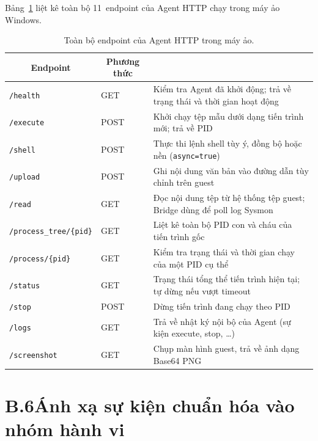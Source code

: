 \documentclass[../DoAn.tex]{subfiles}
\begin{document}
Bảng~\ref{tab:agent-endpoints} liệt kê toàn bộ 11~endpoint của
Agent HTTP chạy trong máy ảo Windows.
\begin{table}[H]
\centering
\caption{Toàn bộ endpoint của Agent HTTP trong máy ảo.}
\label{tab:agent-endpoints}
\begin{tabular}{|l|l|>{\raggedright\arraybackslash}p{6.5cm}|}
\hline
\multicolumn{1}{|c|}{\textbf{Endpoint}} & \multicolumn{1}{c|}{\textbf{Phương thức}} & \multicolumn{1}{c|}{\textbf{Chức năng}} \\
\hline
\texttt{/health}                 & GET  & Kiểm tra Agent đã khởi động; trả về trạng thái và thời gian hoạt động \\
\hline
\texttt{/execute}                & POST & Khởi chạy tệp mẫu dưới dạng tiến trình mới; trả về PID \\
\hline
\texttt{/shell}                  & POST & Thực thi lệnh shell tùy ý, đồng bộ hoặc nền (\texttt{async=true}) \\
\hline
\texttt{/upload}                 & POST & Ghi nội dung văn bản vào đường dẫn tùy chỉnh trên guest \\
\hline
\texttt{/read}                   & GET  & Đọc nội dung tệp từ hệ thống tệp guest; Bridge dùng để poll log Sysmon \\
\hline
\texttt{/process\_tree/\{pid\}}  & GET  & Liệt kê toàn bộ PID con và cháu của tiến trình gốc \\
\hline
\texttt{/process/\{pid\}}        & GET  & Kiểm tra trạng thái và thời gian chạy của một PID cụ thể \\
\hline
\texttt{/status}                 & GET  & Trạng thái tổng thể tiến trình hiện tại; tự dừng nếu vượt timeout \\
\hline
\texttt{/stop}                   & POST & Dừng tiến trình đang chạy theo PID \\
\hline
\texttt{/logs}                   & GET  & Trả về nhật ký nội bộ của Agent (sự kiện execute, stop, \ldots) \\
\hline
\texttt{/screenshot}             & GET  & Chụp màn hình guest, trả về ảnh dạng Base64 PNG \\
\hline
\end{tabular}
\end{table}
\section*{B.6\quad Ánh xạ sự kiện chuẩn hóa vào nhóm hành vi}
\end{document}
